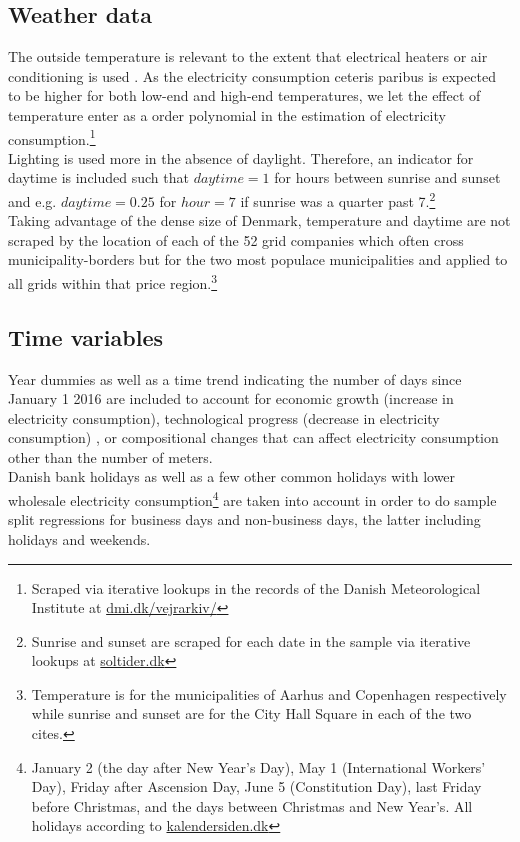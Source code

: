 \subsection{Weather data}
\label{subsec:d_weather}
The outside temperature is relevant to the extent that electrical heaters or air conditioning is used \citep{lijesen2007real, vesterberg2014residential}. As the electricity consumption ceteris paribus is expected to be higher for both low-end and high-end temperatures, we let the effect of temperature enter as a  order polynomial in the estimation of electricity consumption.\footnote{Scraped via iterative lookups in the records of the Danish Meteorological Institute at \href{https://www.dmi.dk/vejrarkiv/}{dmi.dk/vejrarkiv/}}
\medskip\\
Lighting is used more in the absence of daylight. Therefore, an indicator for daytime is included such that $daytime=1$ for hours between sunrise and sunset and e.g. $daytime=0.25$ for $hour=7$ if sunrise was a quarter past 7.\footnote{Sunrise and sunset are scraped for each date in the sample via iterative lookups at \href{https://soltider.dk/}{soltider.dk}}
\medskip\\
Taking advantage of the dense size of Denmark, temperature and daytime are not scraped by the location of each of the 52 grid companies which often cross municipality-borders but for the two most populace municipalities and applied to all grids within that price region.\footnote{Temperature is for the municipalities of Aarhus and Copenhagen respectively while sunrise and sunset are for the City Hall Square in each of the two cites.}

\subsection{Time variables}
\label{subsec:d_time}
Year dummies as well as a time trend indicating the number of days since January 1 2016 are included to account for economic growth (increase in electricity consumption), technological progress (decrease in electricity consumption) \citep{lijesen2007real}, or compositional changes that can affect electricity consumption other than the number of meters.
\medskip\\
Danish bank holidays as well as a few other common holidays with lower wholesale electricity consumption\footnote{January 2 (the day after New Year's Day), May 1 (International Workers' Day), Friday after Ascension Day, June 5 (Constitution Day), last Friday before Christmas, and the days between Christmas and New Year's. All holidays according to \href{https://kalendersiden.dk/}{kalendersiden.dk}} are taken into account in order to do sample split regressions for business days and non-business days, the latter including holidays and weekends.
